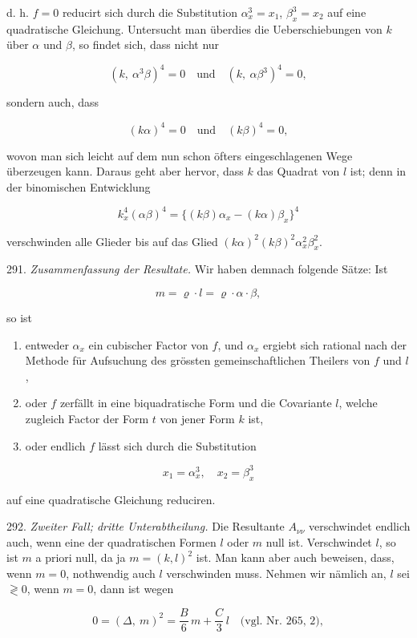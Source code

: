 d. h. $f=0$ reducirt sich durch die Substitution $\alpha_x^3=x_1$, $\beta_x^3=x_2$ auf eine quadratische Gleichung. Untersucht man überdies die Ueberschiebungen von $k$ über $\alpha$ und $\beta$, so findet sich, dass nicht nur

\[ (k,\ \alpha^3\beta)^4=0 \quad \text{und} \quad (k,\ \alpha\beta^3)^4=0, \]

sondern auch, dass

\[ (k\alpha)^4=0 \quad \text{und} \quad (k\beta)^4=0, \]

wovon man sich leicht auf dem nun schon öfters eingeschlagenen Wege überzeugen kann. Daraus geht aber hervor, dass $k$ das Quadrat von $l$ ist; denn in der binomischen Entwicklung

\[ k_x^4(\alpha\beta)^4 = \{(k\beta)\alpha_x - (k\alpha)\beta_x\}^4 \]

verschwinden alle Glieder bis auf das Glied $(k\alpha)^2(k\beta)^2\alpha_x^2\beta_x^2$.

291. \textit{Zusammenfassung der Resultate.} Wir haben demnach folgende Sätze: Ist

\[ m = \varrho \cdot l = \varrho \cdot \alpha \cdot \beta, \]

so ist

\begin{enumerate}
\item[1)] entweder $\alpha_x$ ein cubischer Factor von $f$, und $\alpha_x$ ergiebt sich rational nach der Methode für Aufsuchung des grössten gemeinschaftlichen Theilers von $f$ und $l$,
\item[2)] oder $f$ zerfällt in eine biquadratische Form und die Covariante $l$, welche zugleich Factor der Form $t$ von jener Form $k$ ist,
\item[3)] oder endlich $f$ lässt sich durch die Substitution
\end{enumerate}

\[ x_1 = \alpha_x^3,\quad x_2 = \beta_x^3 \]

auf eine quadratische Gleichung reduciren.

292. \textit{Zweiter Fall; dritte Unterabtheilung.} Die Resultante $A_{\nu\nu}$ verschwindet endlich auch, wenn eine der quadratischen Formen $l$ oder $m$ null ist. Verschwindet $l$, so ist $m$ a priori null, da ja $m=(k,l)^2$ ist. Man kann aber auch beweisen, dass, wenn $m=0$, nothwendig auch $l$ verschwinden muss. Nehmen wir nämlich an, $l$ sei $\gtrless 0$, wenn $m=0$, dann ist wegen

\[ 0 = (\varDelta,\ m)^2 = \frac{B}{6}\, m + \frac{C}{3}\, l \quad \text{(vgl. Nr. 265, 2)}, \]

